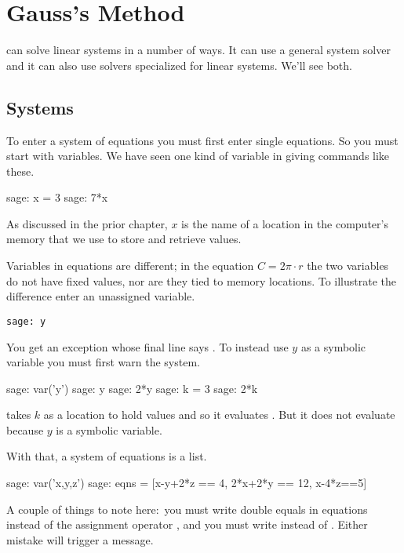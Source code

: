 \chapter{Gauss's Method}

\Sage{} can solve linear systems in a number of ways.
It can use a general system solver and
it can also use solvers specialized for linear systems.
We'll see both. 



\section{Systems}
To enter a system of equations you must first enter single equations.
So you must start with variables.
We have seen one kind of variable in giving commands like these.
\begin{sagecommandline}
sage: x = 3
sage: 7*x
\end{sagecommandline}
As discussed in the prior chapter,
$x$ is the name of a location in the computer's memory
that we use to store and retrieve values.

Variables in equations are different; in the equation
$C=2\pi\cdot r$ the two variables do not have fixed values, nor
are they tied to memory locations. 
To illustrate the difference enter an unassigned 
variable.
\begin{lstlisting}
sage: y
\end{lstlisting}
You get an exception whose final line says
.
To instead use $y$ as a symbolic variable you must first
warn the system.
\begin{sagecommandline}
sage: var('y')
sage: y
sage: 2*y
sage: k = 3
sage: 2*k
\end{sagecommandline}
\Sage{} takes $k$ as a location to hold
values and so it evaluates .
But it does not evaluate  because $y$ is a symbolic variable.

With that, a system of equations is a list.
\begin{sagecommandline}
sage: var('x,y,z')                                  
sage: eqns = [x-y+2*z == 4, 2*x+2*y == 12, x-4*z==5]
\end{sagecommandline}
A couple of things to note here:~you 
must write double equals \inlinecode{==} in equations instead of 
the assignment operator \inlinecode{=}, 
and you must write 
instead of .
Either mistake will trigger a  
 message.


